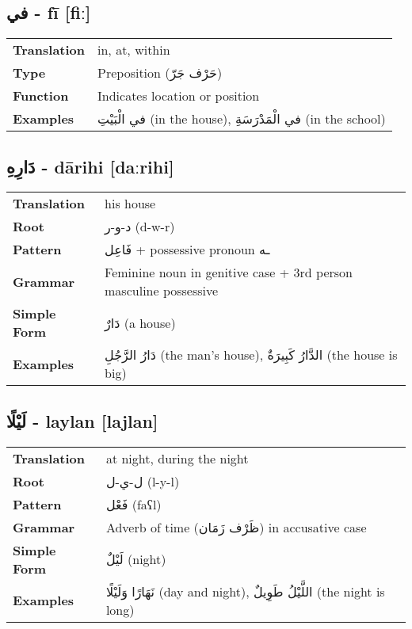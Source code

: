 \documentclass[a4paper,12pt]{article}
\begin{document}
\subsection{\textarabic{في} - \textbf{fī} [fiː]}

\begin{tabular}{p{3cm}p{10cm}}
\toprule
\textbf{Translation} & in, at, within \\
\textbf{Type} & Preposition (\textarabic{حَرْف جَرّ}) \\
\textbf{Function} & Indicates location or position \\
\textbf{Examples} & \textarabic{في الْبَيْتِ} (in the house), \textarabic{في الْمَدْرَسَةِ} (in the school) \\
\bottomrule
\end{tabular}

\subsection{\textarabic{دَارِهِ} - \textbf{dārihi} [daːrihi]}

\begin{tabular}{p{3cm}p{10cm}}
\toprule
\textbf{Translation} & his house \\
\textbf{Root} & \textarabic{د-و-ر} (d-w-r) \\
\textbf{Pattern} & \textarabic{فَاعِل} + possessive pronoun \textarabic{ـه} \\
\textbf{Grammar} & Feminine noun in genitive case + 3rd person masculine possessive \\
\textbf{Simple Form} & \textarabic{دَارٌ} (a house) \\
\textbf{Examples} & \textarabic{دَارُ الرَّجُلِ} (the man's house), \textarabic{الدَّارُ كَبِيرَةٌ} (the house is big) \\
\bottomrule
\end{tabular}

\subsection{\textarabic{لَيْلًا} - \textbf{laylan} [lajlan]}

\begin{tabular}{p{3cm}p{10cm}}
\toprule
\textbf{Translation} & at night, during the night \\
\textbf{Root} & \textarabic{ل-ي-ل} (l-y-l) \\
\textbf{Pattern} & \textarabic{فَعْل} (faʕl) \\
\textbf{Grammar} & Adverb of time (\textarabic{ظَرْف زَمَان}) in accusative case \\
\textbf{Simple Form} & \textarabic{لَيْلٌ} (night) \\
\textbf{Examples} & \textarabic{نَهَارًا وَلَيْلًا} (day and night), \textarabic{اللَّيْلُ طَوِيلٌ} (the night is long) \\
\bottomrule
\end{tabular}
\end{document}
